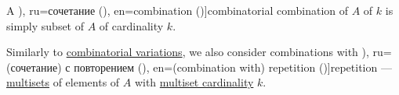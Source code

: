 \begin{definition}\label{def:combinatorial_combination}\mimprovised
  A \term[bg=комбинация (\cite[27]{ДимитровЯнев2007ВероятностиИСтатистика}), ru=сочетание (\cite[172]{Яблонский2003ДискретнаяМатематика}), en=combination (\cite[431]{Rosen2019DiscreteMathematics})]{combinatorial combination} of \( A \) of  \( k \) is simply subset of \( A \) of cardinality \( k \).

  Similarly to \hyperref[def:combinatorial_variation]{combinatorial variations}, we also consider combinations with \term[bg=(комбинация с) повторение (\cite[28]{ДимитровЯнев2007ВероятностиИСтатистика}), ru=(сочетание) с повторением (\cite[172]{Яблонский2003ДискретнаяМатематика}), en=(combination with) repetition (\cite[446]{Rosen2019DiscreteMathematics})]{repetition} --- \hyperref[def:multiset]{multisets} of elements of \( A \) with \hyperref[def:multiset/cardinality]{multiset cardinality} \( k \).
\end{definition}

